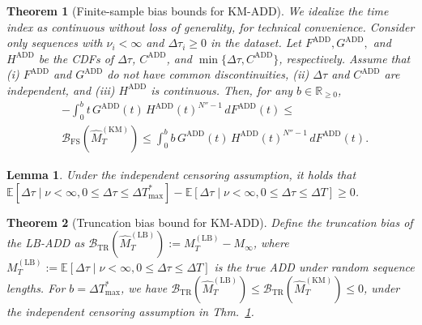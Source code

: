 \documentclass[10pt,a4paper]{amsart}
\newtheorem{theorem}{Theorem}
\newtheorem{lemma}{Lemma}
\def\mbe{\mathbb{E}}
\def\mbr{\mathbb{R}}
\def\nn{\nonumber \\ }
\begin{document}
\begin{theorem}[Finite-sample bias bounds for KM-ADD] \label{thm:Finite-sample bias bounds for KM-ADD}
    We idealize the time index as continuous without loss of generality, for technical convenience.
    Consider only sequences with $\nu_i < \infty$ and $\Delta \tau_i \geq 0$ in the dataset.
    Let $F^\mathrm{ADD}, G^\mathrm{ADD},$ and $H^\mathrm{ADD}$ be the CDFs of $\Delta\tau$, $C^\mathrm{ADD}$, and $\min\{\Delta\tau, C^\mathrm{ADD}\}$, respectively. 
    Assume that (i) $F^\mathrm{ADD}$ and $G^\mathrm{ADD}$ do not have common discontinuities,  (ii) $\Delta\tau$ and $C^\mathrm{ADD}$ are independent, and (iii) $H^\mathrm{ADD}$ is continuous. Then, for any $b \in \mbr_{\geq 0}$,
    \begin{align}
        &-\int_0^{b} t \,G^\mathrm{ADD}(t)\,{H^\mathrm{ADD}}(t)^{N''-1}\,dF^\mathrm{ADD}(t) 
        \leq \nn
        &\mathcal{B}_\mathrm{FS}(\hat{M}_T^\mathrm{(KM)}) 
        \leq 
        \int_0^{b} b\,G^\mathrm{ADD}(t)\,{H^\mathrm{ADD}}(t)^{N''-1}\,dF^\mathrm{ADD}(t).
    \end{align}
\end{theorem}

\begin{lemma} \label{lem:ADD_last_inequality}
    Under the independent censoring assumption, it holds that
    $\mbe[ \Delta \tau \mid \nu < \infty, 0 \leq \Delta \tau \leq \Delta  T_\mathrm{max}^*] 
    - \mbe[\Delta \tau \mid \nu < \infty, 0 \leq \Delta \tau \leq \Delta T] 
    \geq 0$.
\end{lemma}

\begin{theorem}[Truncation bias bound for KM-ADD] \label{thm:Truncation bias bounds for KM-ADD (Appendix)}
    Define the truncation bias of the LB-ADD as $\mathcal{B}_\mathrm{TR}(\hat{M}_T^\mathrm{(LB)}) := M_T^\mathrm{(LB)} - M_\infty$, 
    where $M_T^\mathrm{(LB)} := \mbe[ \Delta \tau \mid \nu < \infty, 0 \leq \Delta \tau \leq \Delta T ]$ is the true ADD under random sequence lengths.
    For $b = \Delta T_\mathrm{max}^*$, we have
    $\mathcal{B}_\mathrm{TR}(\hat{M}_T^\mathrm{(LB)}) \leq \mathcal{B}_\mathrm{TR}(\hat{M}_T^\mathrm{(KM)}) \leq 0$, under the independent censoring assumption in Thm.~\ref{thm:Finite-sample bias bounds for KM-ADD}.
\end{theorem}
\end{document}
